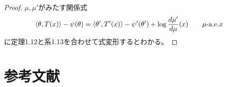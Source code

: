 \documentclass[report]{jlreq}
\begin{document}
\begin{proof}
    $\mu, \mu'$がみたす関係式
    \begin{equation}
        \myangle{\theta}{T(x)} - \psi(\theta)
            = \myangle{\theta'}{T'(x)} - \psi'(\theta')
            + \log \dd[\mu']{\mu}(x)
            \qquad
            \text{$\mu$-a.e.$x$}
    \end{equation}
    に定理1.12と系1.13を合わせて式変形するとわかる。
\end{proof}



%
\section*{参考文献}

\nocite{amari_information_2016}
\nocite{bn1970_pdf}
\nocite{BN78}

{
    \renewcommand{\bibsection}{}
    
    
}
\end{document}
